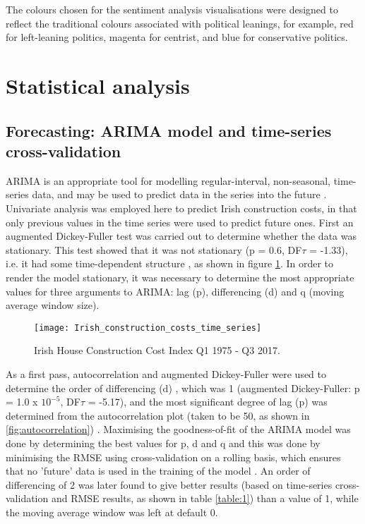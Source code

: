 \documentclass[hidelinks,12pt,oneside]{report} %
\begin{document}
The colours chosen for the sentiment analysis visualisations were designed to reflect the traditional colours associated with political leanings, for example, red for left-leaning politics, magenta for centrist, and blue for conservative politics.

\section{Statistical analysis}
\subsection{Forecasting: ARIMA model and time-series cross-validation}
ARIMA is an appropriate tool for modelling regular-interval, non-seasonal, time-series data, and may be used to predict data in the series into the future \citep{MSc}. Univariate analysis was employed here to predict Irish construction costs, in that only previous values in the time series were used to predict future ones. First an augmented Dickey-Fuller test was carried out to determine whether the data was stationary. This test showed that it was not stationary (p = 0.6, DF$\tau$ = -1.33), i.e. it had some time-dependent structure \citep{DF}, as shown in figure \ref{fig:Irish_construction_costs_time_series}. In order to render the model stationary, it was necessary to determine the most appropriate values for three arguments to ARIMA: lag (p), differencing (d) and q (moving average window size).

\begin{figure}[!ht]
	\centering
	\vspace{.4218cm}
		\texttt{[image: Irish\_construction\_costs\_time\_series]}	\captionsetup{justification=justified,width=1\linewidth}
	\caption{Irish House Construction Cost Index Q1 1975 - Q3 2017.}
\label{fig:Irish_construction_costs_time_series}
\end{figure}

As a first pass, autocorrelation and augmented Dickey-Fuller were used to determine the order of differencing (d) \citep{Raval}, which was 1 (augmented Dickey-Fuller: p = 1.0 x $10^{-5}$, DF$\tau$ = -5.17), and the most significant degree of lag (p) was determined from the autocorrelation plot (taken to be 50, as shown in \ref{fig:autocorrelation}) \citep{Raval, Nadeem}. Maximising the goodness-of-fit of the ARIMA model was done by determining the best values for p, d and q and this was done by minimising the RMSE \citep{Raval, SaS} using cross-validation on a rolling basis, which ensures that no 'future' data is used in the training of the model \citep{SS, Hyn}. An order of differencing of 2 was later found to give better results (based on time-series cross-validation and RMSE results, as shown in table \ref{table:1}) than a value of 1, while the moving average window was left at default 0.
\end{document}
